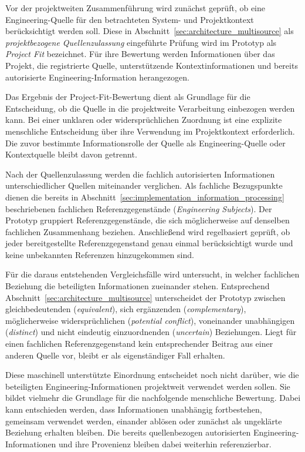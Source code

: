 Vor der projektweiten Zusammenführung wird zunächst geprüft, ob eine
Engineering-Quelle für den betrachteten System- und Projektkontext
berücksichtigt werden soll. Diese in
Abschnitt~\ref{sec:architecture_multisource} als
\emph{projektbezogene Quellenzulassung} eingeführte Prüfung wird im
Prototyp als \emph{Project Fit} bezeichnet. Für ihre Bewertung werden
Informationen über das Projekt, die registrierte Quelle, unterstützende
Kontextinformationen und bereits autorisierte Engineering-Information
herangezogen.

Das Ergebnis der Project-Fit-Bewertung dient als Grundlage für die
Entscheidung, ob die Quelle in die projektweite Verarbeitung einbezogen
werden kann. Bei einer unklaren oder widersprüchlichen Zuordnung ist eine
explizite menschliche Entscheidung über ihre Verwendung im Projektkontext
erforderlich. Die zuvor bestimmte Informationsrolle der Quelle als
Engineering-Quelle oder Kontextquelle bleibt davon getrennt.

Nach der Quellenzulassung werden die fachlich autorisierten Informationen
unterschiedlicher Quellen miteinander verglichen. Als fachliche
Bezugspunkte dienen die bereits in
Abschnitt~\ref{sec:implementation_information_processing} beschriebenen
fachlichen Referenzgegenstände (\emph{Engineering Subjects}). Der Prototyp
gruppiert Referenzgegenstände, die sich möglicherweise auf denselben
fachlichen Zusammenhang beziehen. Anschließend wird regelbasiert geprüft,
ob jeder bereitgestellte Referenzgegenstand genau einmal berücksichtigt
wurde und keine unbekannten Referenzen hinzugekommen sind.

Für die daraus entstehenden Vergleichsfälle wird untersucht, in welcher
fachlichen Beziehung die beteiligten Informationen zueinander stehen.
Entsprechend Abschnitt~\ref{sec:architecture_multisource} unterscheidet der
Prototyp zwischen gleichbedeutenden (\emph{equivalent}), sich ergänzenden
(\emph{complementary}), möglicherweise widersprüchlichen
(\emph{potential conflict}), voneinander unabhängigen (\emph{distinct}) und
nicht eindeutig einzuordnenden (\emph{uncertain}) Beziehungen. Liegt für
einen fachlichen Referenzgegenstand kein entsprechender Beitrag aus einer
anderen Quelle vor, bleibt er als eigenständiger Fall erhalten.

Diese maschinell unterstützte Einordnung entscheidet noch nicht darüber,
wie die beteiligten Engineering-Informationen projektweit verwendet werden
sollen. Sie bildet vielmehr die Grundlage für die nachfolgende menschliche
Bewertung. Dabei kann entschieden werden, dass Informationen unabhängig
fortbestehen, gemeinsam verwendet werden, einander ablösen oder zunächst
als ungeklärte Beziehung erhalten bleiben. Die bereits quellenbezogen
autorisierten Engineering-Informationen und ihre Provenienz bleiben dabei
weiterhin referenzierbar.

